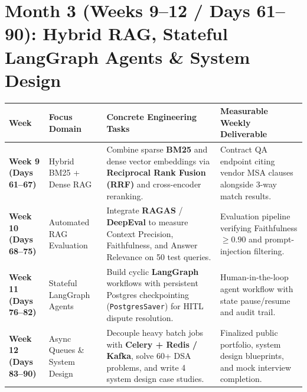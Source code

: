 \documentclass[a4paper,10pt]{article}
\begin{document}
\section{Month 3 (Weeks 9--12 / Days 61--90): Hybrid RAG, Stateful LangGraph Agents \& System Design}
\begin{tabularx}{\textwidth}{@{}p{1.05in}p{1.55in}p{2.25in}X@{}}
\toprule
\textbf{Week} & \textbf{Focus Domain} & \textbf{Concrete Engineering Tasks} & \textbf{Measurable Weekly Deliverable} \\
\midrule
\textbf{Week 9 (Days 61--67)} & Hybrid BM25 + Dense RAG & Combine sparse \textbf{BM25} and dense vector embeddings via \textbf{Reciprocal Rank Fusion (RRF)} and cross-encoder reranking. & Contract QA endpoint citing vendor MSA clauses alongside 3-way match results. \\
\addlinespace[4pt]
\textbf{Week 10 (Days 68--75)} & Automated RAG Evaluation & Integrate \textbf{RAGAS} / \textbf{DeepEval} to measure Context Precision, Faithfulness, and Answer Relevance on 50 test queries. & Evaluation pipeline verifying Faithfulness $\ge 0.90$ and prompt-injection filtering. \\
\addlinespace[4pt]
\textbf{Week 11 (Days 76--82)} & Stateful LangGraph Agents & Build cyclic \textbf{LangGraph} workflows with persistent Postgres checkpointing (\texttt{PostgresSaver}) for HITL dispute resolution. & Human-in-the-loop agent workflow with state pause/resume and audit trail. \\
\addlinespace[4pt]
\textbf{Week 12 (Days 83--90)} & Async Queues \& System Design & Decouple heavy batch jobs with \textbf{Celery + Redis / Kafka}, solve 60+ DSA problems, and write 4 system design case studies. & Finalized public portfolio, system design blueprints, and mock interview completion. \\
\bottomrule
\end{tabularx}
\end{document}

